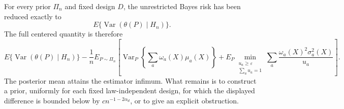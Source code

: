 For every prior \(\Pi_n\) and fixed design \(D\), the unrestricted Bayes risk has been reduced exactly to
\[
E\{\operatorname{Var}(\theta(P)\mid H_n)\}.
\]
The full centered quantity is therefore
\[
E\{\operatorname{Var}(\theta(P)\mid H_n)\}
-\frac1nE_{P\sim\Pi_n}
\left[
\operatorname{Var}_P\!\left\{\sum_a\omega_a(X)\mu_a(X)\right\}
+E_P\min_{\substack{u_a\geq\varepsilon\\\sum_a u_a=1}}
\sum_a\frac{\omega_a(X)^2\sigma_a^2(X)}{u_a}
\right].
\]
The posterior mean attains the estimator infimum. What remains is to construct a prior, uniformly for each fixed law-independent design, for which the displayed difference is bounded below by \(c n^{-1-2\alpha_d}\), or to give an explicit obstruction.
